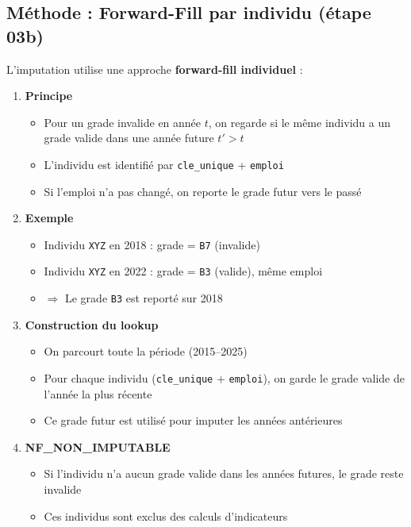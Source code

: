 \documentclass[12pt,a4paper,french]{article}
\newcommand{\colname}[1]{\texttt{#1}}
\begin{document}
\subsection{Méthode : Forward-Fill par individu (étape 03b)}

L'imputation utilise une approche \textbf{forward-fill individuel} :

\begin{enumerate}
    \item \textbf{Principe}
          \begin{itemize}
              \item Pour un grade invalide en année $t$, on regarde si le même
                    individu a un grade valide dans une année future $t' > t$
              \item L'individu est identifié par \colname{cle\_unique} +
                    \colname{emploi}
              \item Si l'emploi n'a pas changé, on reporte le grade futur
                    vers le passé
          \end{itemize}

    \item \textbf{Exemple}
          \begin{itemize}
              \item Individu \texttt{XYZ} en 2018 : grade = \texttt{B7} (invalide)
              \item Individu \texttt{XYZ} en 2022 : grade = \texttt{B3} (valide),
                    même emploi
              \item $\Rightarrow$ Le grade \texttt{B3} est reporté sur 2018
          \end{itemize}

    \item \textbf{Construction du lookup}
          \begin{itemize}
              \item On parcourt toute la période (2015--2025)
              \item Pour chaque individu (\colname{cle\_unique} +
                    \colname{emploi}), on garde le grade valide de l'année
                    la plus récente
              \item Ce grade futur est utilisé pour imputer les années antérieures
          \end{itemize}

    \item \textbf{NF\_NON\_IMPUTABLE}
          \begin{itemize}
              \item Si l'individu n'a aucun grade valide dans les années futures,
                    le grade reste invalide
              \item Ces individus sont exclus des calculs d'indicateurs
          \end{itemize}
\end{enumerate}
\end{document}
